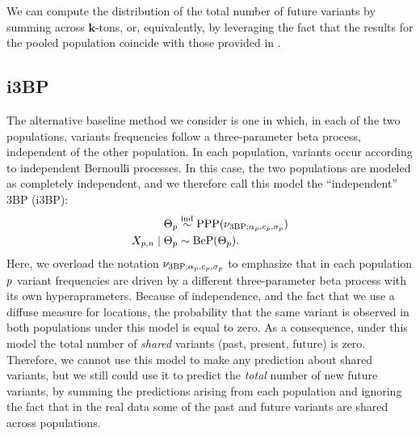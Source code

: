 We can compute the distribution of the total number of future variants by summing across $\bm{k}$-tons, or, equivalently, by leveraging the fact that the results for the pooled population coincide with those provided in \citet{Masoero2021}.


\subsection{i3BP} \label{sec:i3BP}

The alternative baseline method we consider is one in which, in each of the two populations, variants frequencies follow a three-parameter beta process, independent of the other population. In each population, variants occur according to independent Bernoulli processes.  In this case, the two populations are modeled as completely independent, and we therefore call this model the ``independent'' 3BP (i3BP):
\begin{align}
\begin{split}
	\Theta_p &\overset{\text{ind}}{\sim} \mathrm{PPP}(\nu_{\mathrm{3BP}; \alpha_p, c_p, \sigma_p}) \\
	X_{p,n}\mid\Theta_{p} &\sim \mathrm{BeP}(\Theta_p).
\end{split} \label{eq:i3BP}
\end{align}
Here, we overload the notation $\nu_{\mathrm{3BP}; \alpha_p, c_p, \sigma_p}$ to emphasize that in each population $p$ variant frequencies are driven by a different three-parameter beta process with its own hyperaprameters.
Because of independence, and the fact that we use a diffuse measure for locations, the probability that the same variant is observed in both populations under this model is equal to zero. As a consequence, under this model the total number of \emph{shared} variants (past, present, future) is zero. Therefore, we cannot use this model to make any prediction about shared variants, but we still could use it to predict the \emph{total} number of new future variants, by summing the predictions arising from each population and ignoring the fact that in the real data some of the past and future variants are shared across populations. 



